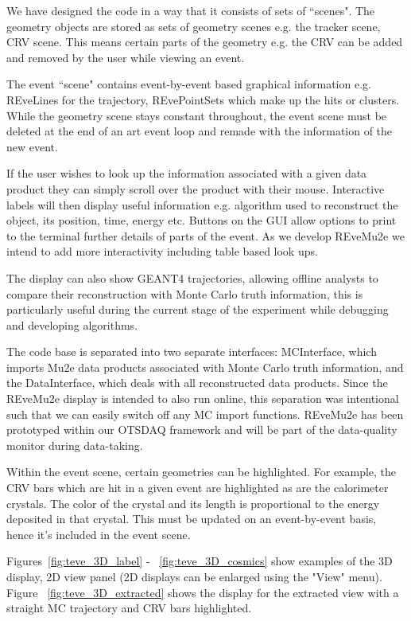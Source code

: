 We have designed the code in a way that it consists of sets of ``scenes". The geometry objects are stored as sets of geometry scenes e.g. the tracker scene, CRV scene. This means certain parts of the geometry e.g. the CRV can be added and removed by the user while viewing an event.

The event ``scene" contains event-by-event based graphical information e.g. REveLines for the trajectory, REvePointSets which make up the hits or clusters. While the geometry scene stays constant throughout, the event scene must be deleted at the end of an art event loop and remade with the information of the new event.

If the user wishes to look up the information associated with a given data product they can simply scroll over the product with their mouse. Interactive labels will then display useful information e.g. algorithm used to reconstruct the object, its position, time, energy etc. Buttons on the GUI allow options to print to the terminal further details of parts of the event. As we develop REveMu2e we intend to add more interactivity including table based look ups.

The display can also show GEANT4 trajectories, allowing offline analysts to compare their reconstruction with Monte Carlo truth information, this is particularly useful during the current stage of the experiment while debugging and developing algorithms. 

The code base is separated into two separate interfaces: MCInterface, which imports Mu2e data products associated with Monte Carlo truth information, and the DataInterface, which deals with all reconstructed data products. Since the REveMu2e display is intended to also run online, this separation was intentional such that we can easily switch off any MC import functions. REveMu2e has been prototyped within our OTSDAQ framework and will be part of the data-quality monitor during data-taking.

Within the event scene, certain geometries can be highlighted. For example, the CRV bars which are hit in a given event are highlighted as are the calorimeter crystals. The color of the crystal and its length is proportional to the energy deposited in that crystal. This must be updated on an event-by-event basis, hence it's included in the event scene.

Figures~\ref{fig:teve_3D_label} - ~\ref{fig:teve_3D_cosmics} show examples of the 3D display, 2D view panel (2D displays can be enlarged using the "View" menu). Figure ~\ref{fig:teve_3D_extracted} shows the display for the extracted view with a straight MC trajectory and CRV bars highlighted.


